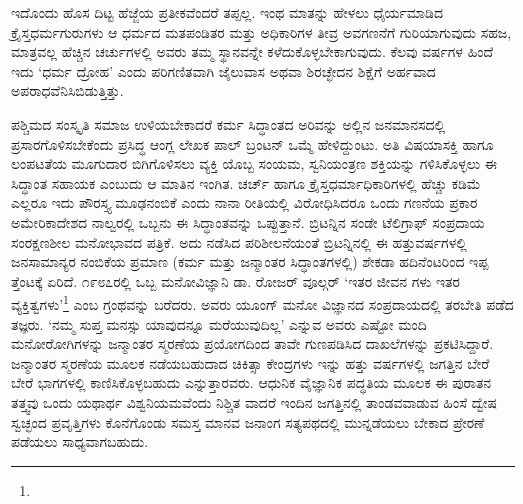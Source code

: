 ಇದೊಂದು ಹೊಸ ದಿಟ್ಟ ಹೆಜ್ಜೆಯ ಪ್ರತೀಕವೆಂದರೆ ತಪ್ಪಲ್ಲ. ಇಂಥ ಮಾತನ್ನು ಹೇಳಲು ಧೈರ್ಯಮಾಡಿದ ಕ್ರೈಸ್ತಧರ್ಮಗುರುಗಳು ಆ ಧರ್ಮದ ಮತಪಂಡಿತರ ಮತ್ತು ಅಧಿಕಾರಿಗಳ ತೀವ್ರ ಅವಗಣನೆಗೆ ಗುರಿಯಾಗುವುದು ಸಹಜ, ಮಾತ್ರವಲ್ಲ ಹೆಚ್ಚಿನ ಚರ್ಚುಗಳಲ್ಲಿ ಅವರು ತಮ್ಮ ಸ್ಥಾನವನ್ನೇ ಕಳೆದುಕೊಳ್ಳಬೇಕಾಗುವುದು. ಕೆಲವು ವರ್ಷಗಳ ಹಿಂದೆ ಇದು ‘ಧರ್ಮ ದ್ರೋಹ’ ಎಂದು ಪರಿಗಣಿತವಾಗಿ ಜೈಲುವಾಸ ಅಥವಾ ಶಿರಚ್ಛೇದನ ಶಿಕ್ಷೆಗೆ ಅರ್ಹವಾದ ಅಪರಾಧವೆನಿಸಿಬಿಡುತ್ತಿತ್ತು.

ಪಶ್ಚಿಮದ ಸಂಸ್ಕೃತಿ ಸಮಾಜ ಉಳಿಯಬೇಕಾದರೆ ಕರ್ಮ ಸಿದ್ಧಾಂತದ ಅರಿವನ್ನು ಅಲ್ಲಿನ ಜನಮಾನಸದಲ್ಲಿ ಪ್ರಸಾರಗೊಳಿಸಬೇಕೆಂದು ಪ್ರಸಿದ್ಧ ಆಂಗ್ಲ ಲೇಖಕ ಪಾಲ್ ಬ್ರಂಟನ್ ಒಮ್ಮೆ ಹೇಳಿದ್ದುಂಟು. ಅತಿ ವಿಷಯಾಸಕ್ತಿ ಹಾಗೂ ಲಂಪಟತೆಯ ಮೂಗುದಾರ ಬಿಗಿಗೊಳಿಸಲು ವ್ಯಕ್ತಿ ಯೊಬ್ಬ ಸಂಯಮ, ಸ್ವನಿಯಂತ್ರಣ ಶಕ್ತಿಯನ್ನು ಗಳಿಸಿಕೊಳ್ಳಲು ಈ ಸಿದ್ಧಾಂತ ಸಹಾಯಕ ಎಂಬುದು ಆ ಮಾತಿನ ಇಂಗಿತ. ಚರ್ಚ್ ಹಾಗೂ ಕ್ರೈಸ್ತಧರ್ಮಾಧಿಕಾರಿಗಳಲ್ಲಿ ಹೆಚ್ಚು ಕಡಿಮೆ ಎಲ್ಲರೂ ಇದು ಪೌರಸ್ತ್ಯ ಮೂಢನಂಬಿಕೆ ಎಂದು ನಾನಾ ರೀತಿಯಲ್ಲಿ ವಿರೋಧಿಸಿದರೂ ಒಂದು ಗಣನೆಯ ಪ್ರಕಾರ ಅಮೇರಿಕಾದೇಶದ ನಾಲ್ವರಲ್ಲಿ ಒಬ್ಬನು ಈ ಸಿದ್ಧಾಂತವನ್ನು ಒಪ್ಪುತ್ತಾನೆ. ಬ್ರಿಟನ್ನಿನ ಸಂಡೇ ಟೆಲಿಗ್ರಾಫ್ ಸಂಪ್ರದಾಯ ಸಂರಕ್ಷಣಶೀಲ ಮನೋಭಾವದ ಪತ್ರಿಕೆ. ಅದು ನಡೆಸಿದ ಪರಿಶೀಲನೆಯಂತೆ ಬ್ರಿಟನ್ನಿನಲ್ಲಿ ಈ ಹತ್ತುವರ್ಷಗಳಲ್ಲಿ ಜನಸಾಮಾನ್ಯರ ನಂಬಿಕೆಯ ಪ್ರಮಾಣ (ಕರ್ಮ ಮತ್ತು ಜನ್ಮಾಂತರ ಸಿದ್ಧಾಂತಗಳಲ್ಲಿ) ಶೇಕಡಾ ಹದಿನೆಂಟರಿಂದ ಇಪ್ಪ ತ್ತೆಂಟಕ್ಕೆ ಏರಿದೆ. ೧೯೮೭ರಲ್ಲಿ ಒಬ್ಬ ಮನೋವಿಜ್ಞಾನಿ ಡಾ. ರೋಜರ್ ವೂಲ್ಗರ್ ‘ಇತರ ಜೀವನ ಗಳು ಇತರ ವ್ಯಕ್ತಿತ್ವಗಳು’\footnote{\hfill{}} ಎಂಬ ಗ್ರಂಥವನ್ನು ಬರೆದರು. ಅವರು ಯೂಂಗ್ ಮನೋ ವಿಜ್ಞಾನದ ಸಂಪ್ರದಾಯದಲ್ಲಿ ತರಬೇತಿ ಪಡೆದ ತಜ್ಞರು. ‘ನಮ್ಮ ಸುಪ್ತ ಮನಸ್ಸು ಯಾವುದನ್ನೂ ಮರೆಯುವುದಿಲ್ಲ’ ಎನ್ನುವ ಅವರು ಎಷ್ಟೋ ಮಂದಿ ಮನೋರೋಗಿಗಳನ್ನು ಜನ್ಮಾಂತರ ಸ್ಮರಣೆಯ ಪ್ರಯೋಗದಿಂದ ತಾವೇ ಗುಣಪಡಿಸಿದ ದಾಖಲೆಗಳನ್ನು ಪ್ರಕಟಿಸಿದ್ದಾರೆ. ಜನ್ಮಾಂತರ ಸ್ಮರಣೆಯ ಮೂಲಕ ನಡೆಯಬಹುದಾದ ಚಿಕಿತ್ಸಾ ಕೇಂದ್ರಗಳು ಇನ್ನು ಹತ್ತು ವರ್ಷಗಳಲ್ಲಿ ಜಗತ್ತಿನ ಬೇರೆ ಬೇರೆ ಭಾಗಗಳಲ್ಲಿ ಕಾಣಿಸಿಕೊಳ್ಳಬಹುದು ಎನ್ನುತ್ತಾರವರು. ಆಧುನಿಕ ವೈಜ್ಞಾನಿಕ ಪದ್ಧತಿಯ ಮೂಲಕ ಈ ಪುರಾತನ ತತ್ತ್ವವು ಒಂದು ಯಥಾರ್ಥ ವಿಶ್ವನಿಯಮವೆಂದು ನಿಶ್ಚಿತ ವಾದರೆ ಇಂದಿನ ಜಗತ್ತಿನಲ್ಲಿ ತಾಂಡವವಾಡುವ ಹಿಂಸೆ ದ್ವೇಷ ಸ್ವಚ್ಛಂದ ಪ್ರವೃತ್ತಿಗಳು ಕೊನೆಗೊಂಡು ಸಮಸ್ತ ಮಾನವ ಜನಾಂಗ ಸತ್ಯಪಥದಲ್ಲಿ ಮುನ್ನಡೆಯಲು ಬೇಕಾದ ಪ್ರೇರಣೆ ಪಡೆಯಲು ಸಾಧ್ಯವಾಗಬಹುದು.

